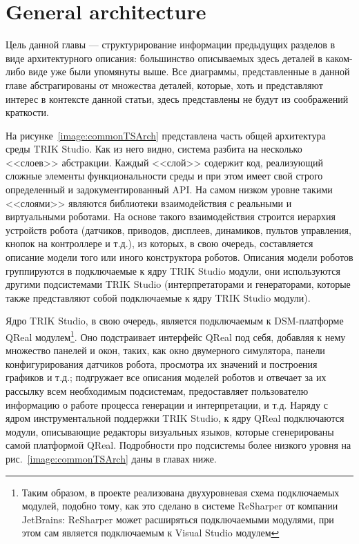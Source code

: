 \documentclass[conference]{IEEEtran}
\begin{document}
\section{General architecture}
\label{chapter:commonArchitecture}

Цель данной главы --- структурирование информации предыдущих разделов в виде архитектурного описания: большинство описываемых здесь деталей в каком-либо виде уже были упомянуты выше. Все диаграммы, представленные в данной главе абстрагированы от множества деталей, которые, хоть и представляют интерес в контексте данной статьи, здесь представлены не будут из соображений краткости.

На рисунке~\ref{image:commonTSArch} представлена часть общей архитектура среды TRIK Studio. Как из него видно, система разбита на несколько <<слоев>> абстракции. Каждый <<слой>> содержит код, реализующий сложные элементы функциональности среды и при этом имеет свой строго определенный и задокументированный API. На самом низком уровне такими <<слоями>> являются библиотеки взаимодействия с реальными и виртуальными роботами. На основе такого взаимодействия строится иерархия устройств робота (датчиков, приводов, дисплеев, динамиков, пультов управления, кнопок на контроллере и т.д.), из которых, в свою очередь, составляется описание модели того или иного конструктора роботов. Описания модели роботов группируются в подключаемые к ядру TRIK Studio модули, они используются другими подсистемами TRIK Studio (интерпретаторами и генераторами, которые также представляют собой подключаемые к ядру TRIK Studio модули).

Ядро TRIK Studio, в свою очередь, является подключаемым к DSM-платформе QReal модулем\footnote{Таким образом, в проекте реализована двухуровневая схема подключаемых модулей, подобно тому, как это сделано в системе ReSharper от компании JetBrains: ReSharper может расширяться подключаемыми модулями, при этом сам является подключаемым к Visual Studio модулем}. Оно подстраивает интерфейс QReal под себя, добавляя к нему множество панелей и окон, таких, как окно двумерного симулятора, панели конфигурирования датчиков робота, просмотра их значений и построения графиков и т.д.; подгружает все описания моделей роботов и отвечает за их рассылку всем необходимым подсистемам, предоставляет пользователю информацию о работе процесса генерации и интерпретации, и т.д. Наряду с ядром инструментальной поддержки TRIK Studio, к ядру QReal подключаются модули, описывающие редакторы визуальных языков, которые сгенерированы самой платформой QReal. Подробности про подсистемы более низкого уровня на рис.~\ref{image:commonTSArch} даны в главах ниже.
\end{document}
